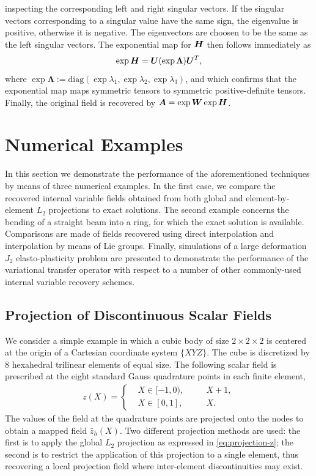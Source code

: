 \documentclass[12pt]{article}
\newcommand{\mbs}[1]{\boldsymbol{#1}}
\def\bA{{\mbs{A}}} \def\bB{{\mbs{B}}} \def\bC{{\mbs{C}}}
\def\bLambda{{\mbs{\Lambda}}}
\begin{document}
inspecting the corresponding left and right singular vectors. If the
singular vectors corresponding to a singular value have the same sign, the
eigenvalue is positive, otherwise it is negative. The eigenvectors are choosen
to be the same as the left singular vectors. The exponential map for $\bH$ then
follows immediately as
\begin{equation}
  \exp \bH = \bU (\exp \bLambda) \bU^T,
  \label{eq:exp-symmetric}
\end{equation}
where
$\exp \bLambda := \text{diag}(\exp \lambda_1,\exp \lambda_2, \exp \lambda_3)$,
and which confirms that the exponential map maps symmetric tensors to symmetric
positive-definite tensors. Finally, the original field is recovered by $\bA =
\exp \bW \exp \bH$.

\section{Numerical Examples}

In this section we demonstrate the performance of the aforementioned techniques
by means of three numerical examples. In the first case, we compare the
recovered internal variable fields obtained from both global and
element-by-element $L_2$ projections to exact solutions. The second example
concerns the bending of a straight beam into a ring, for which the exact
solution is available. Comparisons are made of fields recovered using direct
interpolation and interpolation by means of Lie groups. Finally, simulations of
a large deformation $J_2$ elasto-plasticity problem are presented to demonstrate
the performance of the variational transfer operator with respect to a number of
other commonly-used internal variable recovery schemes.

\subsection{Projection of Discontinuous Scalar Fields}

We consider a simple example in which a cubic body of size $2 \times 2 \times 2$
is centered at the origin of a Cartesian coordinate system $\{XYZ\}$. The cube
is discretized by 8 hexahedral trilinear elements of equal size. The following
scalar field is prescribed at the eight standard Gauss quadrature points in each
finite element,
\begin{align}
  z(X) =
  \left\{
    \begin{aligned}
      & X \in [-1, 0), & \quad & X + 1,
      \\
      & X \in [0, 1], & \quad & X.
    \end{aligned}
  \right. \label{eq:prescribed-scalar}
\end{align}
The values of the field at the quadrature points are projected onto
the nodes to obtain a mapped field $\bar{z}_{h}(X)$. Two different
projection methods are used: the first is to apply the global $L_2$
projection as expressed in \eqref{eq:projection-z}; the second is to
restrict the application of this projection to a single element, thus
recovering a local projection field where inter-element
discontinuities may exist.
\end{document}
